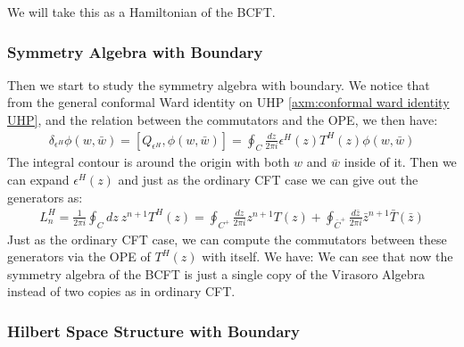 We will take this as a Hamiltonian of the BCFT.


\subsubsection{Symmetry Algebra with Boundary}

Then we start to study the symmetry algebra with boundary. We notice that from the general conformal Ward identity on UHP \cref{axm:conformal ward identity UHP}, and the relation between the commutators and the OPE, we then have:
\begin{align}
  \delta_{\epsilon^H} \phi(w,\bar{w}) = [Q_{\epsilon^H}, \phi(w,\bar{w})] = \oint_{C} \frac{dz}{2\pi i} \epsilon^H(z) T^H(z) \phi(w,\bar{w})
\end{align}
The integral contour is around the origin with both $ w $ and $ \bar{w} $ inside of it. Then we can expand $ \epsilon^H(z) $ and just as the ordinary CFT case we can give out the generators as:
\begin{align}
  L_n^H = \frac{1}{2\pi i} \oint_{C} dz \ z^{n+1} T^H(z) = \oint_{C^+} \frac{dz}{2\pi i} z^{n+1} T(z) + \oint_{\bar{C}^+} \frac{d\bar{z}}{2\pi i} \bar{z}^{n+1} \bar{T}(\bar{z})
\end{align}
Just as the ordinary CFT case, we can compute the commutators between these generators via the OPE of $ T^H(z) $ with itself. We have:
We can see that now the symmetry algebra of the BCFT is just a single copy of the Virasoro Algebra instead of two copies as in ordinary CFT. 

\subsubsection{Hilbert Space Structure with Boundary}


